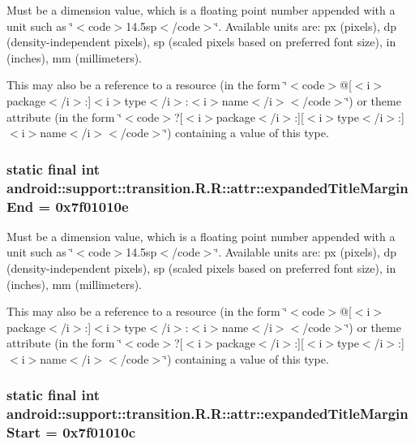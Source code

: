Must be a dimension value, which is a floating point number appended with a unit such as \char`\"{}$<$code$>$14.5sp$<$/code$>$\char`\"{}. Available units are: px (pixels), dp (density-independent pixels), sp (scaled pixels based on preferred font size), in (inches), mm (millimeters). 

This may also be a reference to a resource (in the form \char`\"{}$<$code$>$@\mbox{[}$<$i$>$package$<$/i$>$:\mbox{]}$<$i$>$type$<$/i$>$:$<$i$>$name$<$/i$>$$<$/code$>$\char`\"{}) or theme attribute (in the form \char`\"{}$<$code$>$?\mbox{[}$<$i$>$package$<$/i$>$:\mbox{]}\mbox{[}$<$i$>$type$<$/i$>$:\mbox{]}$<$i$>$name$<$/i$>$$<$/code$>$\char`\"{}) containing a value of this type. \hypertarget{classandroid_1_1support_1_1transition_1_1_r_1_1attr_f51364bcbff26d4e96fc31bfd198a6fb}{
\subsubsection[{expandedTitleMarginEnd}]{\setlength{\rightskip}{0pt plus 5cm}static final int android::support::transition.R.R::attr::expandedTitleMarginEnd = 0x7f01010e}}
\label{classandroid_1_1support_1_1transition_1_1_r_1_1attr_f51364bcbff26d4e96fc31bfd198a6fb}


Must be a dimension value, which is a floating point number appended with a unit such as \char`\"{}$<$code$>$14.5sp$<$/code$>$\char`\"{}. Available units are: px (pixels), dp (density-independent pixels), sp (scaled pixels based on preferred font size), in (inches), mm (millimeters). 

This may also be a reference to a resource (in the form \char`\"{}$<$code$>$@\mbox{[}$<$i$>$package$<$/i$>$:\mbox{]}$<$i$>$type$<$/i$>$:$<$i$>$name$<$/i$>$$<$/code$>$\char`\"{}) or theme attribute (in the form \char`\"{}$<$code$>$?\mbox{[}$<$i$>$package$<$/i$>$:\mbox{]}\mbox{[}$<$i$>$type$<$/i$>$:\mbox{]}$<$i$>$name$<$/i$>$$<$/code$>$\char`\"{}) containing a value of this type. \hypertarget{classandroid_1_1support_1_1transition_1_1_r_1_1attr_5b040e931fadce4de0e0ea898422c5c0}{
\subsubsection[{expandedTitleMarginStart}]{\setlength{\rightskip}{0pt plus 5cm}static final int android::support::transition.R.R::attr::expandedTitleMarginStart = 0x7f01010c}}
\label{classandroid_1_1support_1_1transition_1_1_r_1_1attr_5b040e931fadce4de0e0ea898422c5c0}



